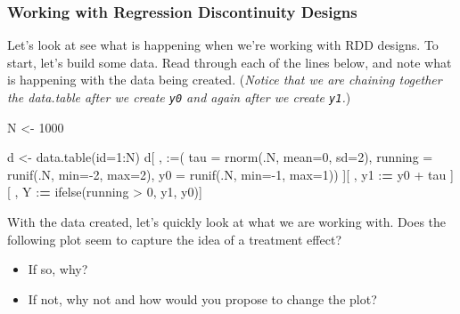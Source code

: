 \documentclass[
]{article}
\newenvironment{Shaded}{\begin{snugshade}}{\end{snugshade}}
\newcommand{\AttributeTok}[1]{\textcolor[rgb]{0.77,0.63,0.00}{#1}}
\newcommand{\DecValTok}[1]{\textcolor[rgb]{0.00,0.00,0.81}{#1}}
\newcommand{\ErrorTok}[1]{\textcolor[rgb]{0.64,0.00,0.00}{\textbf{#1}}}
\newcommand{\FunctionTok}[1]{\textcolor[rgb]{0.00,0.00,0.00}{#1}}
\newcommand{\NormalTok}[1]{#1}
\newcommand{\OtherTok}[1]{\textcolor[rgb]{0.56,0.35,0.01}{#1}}
\newcommand{\SpecialCharTok}[1]{\textcolor[rgb]{0.00,0.00,0.00}{#1}}
\newcommand{\StringTok}[1]{\textcolor[rgb]{0.31,0.60,0.02}{#1}}
\begin{document}
\hypertarget{working-with-regression-discontinuity-designs}{%
\subsubsection{Working with Regression Discontinuity Designs}\label{working-with-regression-discontinuity-designs}}

Let's look at see what is happening when we're working with RDD designs. To start, let's build some data. Read through each of the lines below, and note what is happening with the data being created. (\emph{Notice that we are chaining together the data.table after we create \texttt{y0} and again after we create \texttt{y1}.})

\begin{Shaded}
\begin{Highlighting}[]
\NormalTok{N }\OtherTok{\textless{}{-}} \DecValTok{1000}

\NormalTok{d }\OtherTok{\textless{}{-}} \FunctionTok{data.table}\NormalTok{(}\AttributeTok{id=}\DecValTok{1}\SpecialCharTok{:}\NormalTok{N)}
\NormalTok{d[ , }\StringTok{\textquotesingle{}:=\textquotesingle{}}\NormalTok{(}
  \AttributeTok{tau     =} \FunctionTok{rnorm}\NormalTok{(.N, }\AttributeTok{mean=}\DecValTok{0}\NormalTok{, }\AttributeTok{sd=}\DecValTok{2}\NormalTok{), }
  \AttributeTok{running =} \FunctionTok{runif}\NormalTok{(.N, }\AttributeTok{min=}\SpecialCharTok{{-}}\DecValTok{2}\NormalTok{, }\AttributeTok{max=}\DecValTok{2}\NormalTok{), }
  \AttributeTok{y0      =} \FunctionTok{runif}\NormalTok{(.N, }\AttributeTok{min=}\SpecialCharTok{{-}}\DecValTok{1}\NormalTok{, }\AttributeTok{max=}\DecValTok{1}\NormalTok{)) ][ , }
\NormalTok{  y1     }\SpecialCharTok{:}\ErrorTok{=}\NormalTok{ y0 }\SpecialCharTok{+}\NormalTok{ tau ][ , }
\NormalTok{  Y      }\SpecialCharTok{:}\ErrorTok{=} \FunctionTok{ifelse}\NormalTok{(running }\SpecialCharTok{\textgreater{}} \DecValTok{0}\NormalTok{, y1, y0)]}
\end{Highlighting}
\end{Shaded}

With the data created, let's quickly look at what we are working with. Does the following plot seem to capture the idea of a treatment effect?

\begin{itemize}
\item
  If so, why?
\item
  If not, why not and how would you propose to change the plot?
\end{itemize}
\end{document}
